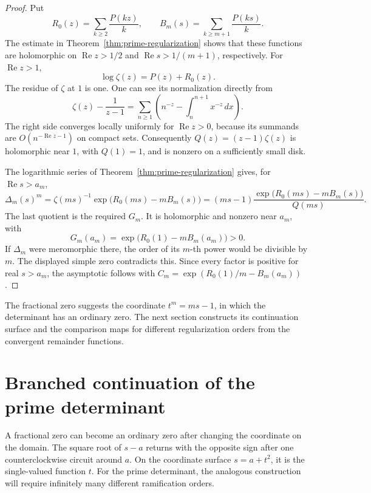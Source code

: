 \begin{proof}
Put
\[
 R_0(z)=\sum_{k\geq2}\frac{P(kz)}k,\qquad
 B_m(s)=\sum_{k\geq m+1}\frac{P(ks)}k.
\]
The estimate in Theorem~\ref{thm:prime-regularization} shows that these
functions are holomorphic on \(\operatorname{Re}z>1/2\) and
\(\operatorname{Re}s>1/(m+1)\), respectively.
For \(\operatorname{Re}z>1\),
\[
 \log\zeta(z)=P(z)+R_0(z).
\]
The residue of \(\zeta\) at \(1\) is one.  One can see its normalization
directly from
\[
 \zeta(z)-\frac1{z-1}
 =\sum_{n\geq1}\left(n^{-z}-\int_n^{n+1}x^{-z}\,dx\right).
\]
The right side converges locally uniformly for \(\operatorname{Re}z>0\),
because its summands are \(O(n^{-\operatorname{Re}z-1})\) on compact
sets.  Consequently \(Q(z)=(z-1)\zeta(z)\) is holomorphic near \(1\),
with \(Q(1)=1\), and is nonzero on a sufficiently small disk.

The logarithmic series of Theorem~\ref{thm:prime-regularization} gives, for
\(\operatorname{Re}s>a_m\),
\[
 \Delta_m(s)^m
 =\zeta(ms)^{-1}\exp\bigl(R_0(ms)-mB_m(s)\bigr)
 =(ms-1)\frac{\exp\bigl(R_0(ms)-mB_m(s)\bigr)}{Q(ms)}.
\]
The last quotient is the required \(G_m\).  It is holomorphic and nonzero
near \(a_m\), with
\[
 G_m(a_m)=\exp\bigl(R_0(1)-mB_m(a_m)\bigr)>0.
\]
If \(\Delta_m\) were meromorphic there, the order of its \(m\)-th power
would be divisible by \(m\).  The displayed simple zero contradicts this.
Since every factor is positive for real \(s>a_m\), the asymptotic follows
with \(C_m=\exp(R_0(1)/m-B_m(a_m))\).
\end{proof}

The fractional zero suggests the coordinate \(t^m=ms-1\), in which
the determinant has an ordinary zero.  The next section constructs its
continuation surface and the comparison maps for different regularization
orders from the convergent remainder functions.

\section{Branched continuation of the prime determinant}
\label{sec:prime-continuation}

A fractional zero can become an ordinary zero after changing the
coordinate on the domain.  The square root of \(s-a\) returns with the
opposite sign after one counterclockwise circuit around \(a\).
On the coordinate surface \(s=a+t^2\), it is the single-valued function
\(t\).  For the prime determinant, the analogous construction will require
infinitely many different ramification orders.

